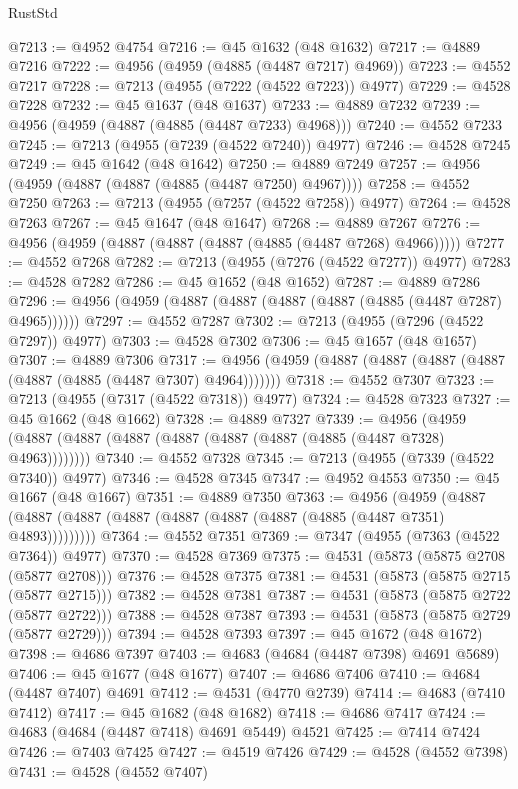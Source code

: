 \begin{lexlean}{RustStd}
\begin{coremodule}
@7213 := @4952 @4754
@7216 := @45 @1632 (@48 @1632)
@7217 := @4889 @7216
@7222 := @4956 (@4959 (@4885 (@4487 @7217) @4969))
@7223 := @4552 @7217
@7228 := @7213 (@4955 (@7222 (@4522 @7223)) @4977)
@7229 := @4528 @7228
@7232 := @45 @1637 (@48 @1637)
@7233 := @4889 @7232
@7239 := @4956 (@4959 (@4887 (@4885 (@4487 @7233) @4968)))
@7240 := @4552 @7233
@7245 := @7213 (@4955 (@7239 (@4522 @7240)) @4977)
@7246 := @4528 @7245
@7249 := @45 @1642 (@48 @1642)
@7250 := @4889 @7249
@7257 := @4956 (@4959 (@4887 (@4887 (@4885 (@4487 @7250) @4967))))
@7258 := @4552 @7250
@7263 := @7213 (@4955 (@7257 (@4522 @7258)) @4977)
@7264 := @4528 @7263
@7267 := @45 @1647 (@48 @1647)
@7268 := @4889 @7267
@7276 := @4956 (@4959 (@4887 (@4887 (@4887 (@4885 (@4487 @7268) @4966)))))
@7277 := @4552 @7268
@7282 := @7213 (@4955 (@7276 (@4522 @7277)) @4977)
@7283 := @4528 @7282
@7286 := @45 @1652 (@48 @1652)
@7287 := @4889 @7286
@7296 := @4956 (@4959 (@4887 (@4887 (@4887 (@4887 (@4885 (@4487 @7287) @4965))))))
@7297 := @4552 @7287
@7302 := @7213 (@4955 (@7296 (@4522 @7297)) @4977)
@7303 := @4528 @7302
@7306 := @45 @1657 (@48 @1657)
@7307 := @4889 @7306
@7317 := @4956 (@4959 (@4887 (@4887 (@4887 (@4887 (@4887 (@4885 (@4487 @7307) @4964)))))))
@7318 := @4552 @7307
@7323 := @7213 (@4955 (@7317 (@4522 @7318)) @4977)
@7324 := @4528 @7323
@7327 := @45 @1662 (@48 @1662)
@7328 := @4889 @7327
@7339 := @4956 (@4959 (@4887 (@4887 (@4887 (@4887 (@4887 (@4887 (@4885 (@4487 @7328) @4963))))))))
@7340 := @4552 @7328
@7345 := @7213 (@4955 (@7339 (@4522 @7340)) @4977)
@7346 := @4528 @7345
@7347 := @4952 @4553
@7350 := @45 @1667 (@48 @1667)
@7351 := @4889 @7350
@7363 := @4956
    (@4959 (@4887 (@4887 (@4887 (@4887 (@4887 (@4887 (@4887 (@4885 (@4487 @7351) @4893)))))))))
@7364 := @4552 @7351
@7369 := @7347 (@4955 (@7363 (@4522 @7364)) @4977)
@7370 := @4528 @7369
@7375 := @4531 (@5873 (@5875 @2708 (@5877 @2708)))
@7376 := @4528 @7375
@7381 := @4531 (@5873 (@5875 @2715 (@5877 @2715)))
@7382 := @4528 @7381
@7387 := @4531 (@5873 (@5875 @2722 (@5877 @2722)))
@7388 := @4528 @7387
@7393 := @4531 (@5873 (@5875 @2729 (@5877 @2729)))
@7394 := @4528 @7393
@7397 := @45 @1672 (@48 @1672)
@7398 := @4686 @7397
@7403 := @4683 (@4684 (@4487 @7398) @4691 @5689)
@7406 := @45 @1677 (@48 @1677)
@7407 := @4686 @7406
@7410 := @4684 (@4487 @7407) @4691
@7412 := @4531 (@4770 @2739)
@7414 := @4683 (@7410 @7412)
@7417 := @45 @1682 (@48 @1682)
@7418 := @4686 @7417
@7424 := @4683 (@4684 (@4487 @7418) @4691 @5449) @4521
@7425 := @7414 @7424
@7426 := @7403 @7425
@7427 := @4519 @7426
@7429 := @4528 (@4552 @7398)
@7431 := @4528 (@4552 @7407)

\end{coremodule}
\end{lexlean}
